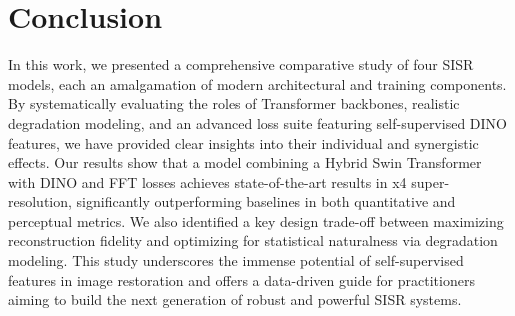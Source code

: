 \documentclass[10pt,twocolumn,letterpaper]{article}
\begin{document}
\section{Conclusion}
\label{sec:conclusion}
In this work, we presented a comprehensive comparative study of four SISR models, each an amalgamation of modern architectural and training components. By systematically evaluating the roles of Transformer backbones, realistic degradation modeling, and an advanced loss suite featuring self-supervised DINO features, we have provided clear insights into their individual and synergistic effects. Our results show that a model combining a Hybrid Swin Transformer with DINO and FFT losses achieves state-of-the-art results in x4 super-resolution, significantly outperforming baselines in both quantitative and perceptual metrics. We also identified a key design trade-off between maximizing reconstruction fidelity and optimizing for statistical naturalness via degradation modeling. This study underscores the immense potential of self-supervised features in image restoration and offers a data-driven guide for practitioners aiming to build the next generation of robust and powerful SISR systems.

{\small

% 
}
\end{document}
